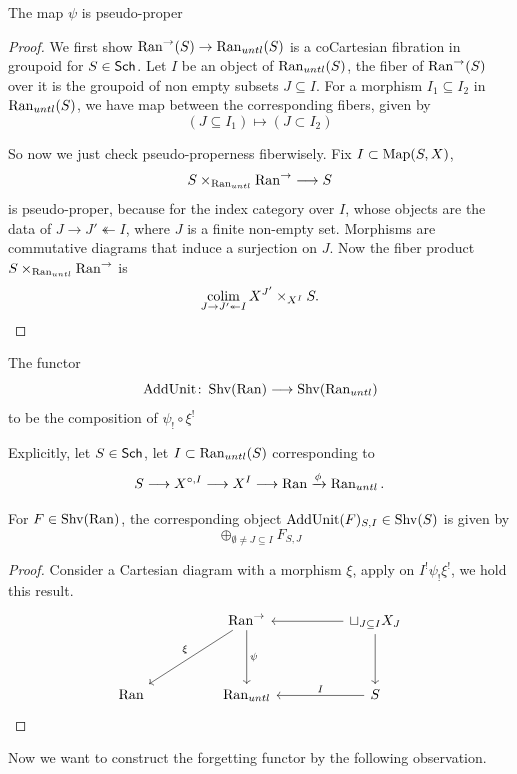 \documentclass[oneside]{amsart}
\begin{document}
\begin{proposition}\cite[Lemma~4.3.2]{abott}
     The map $\psi$ is pseudo-proper
\end{proposition}

\begin{proof}
    We first show $\Ran^{\to}(S) \to \Ran_{untl} (S)$ is a coCartesian fibration in groupoid for $S \in \mathsf{Sch}$. Let $I$ be an object of $\operatorname{Ran}_{untl}(S)$, the fiber of $\Ran^{\to}(S)$ over it is the groupoid of non empty subsets $J \subseteq I$. For a morphism $I_1 \subseteq I_2$ in $\operatorname{Ran}_{untl}(S)$, we have map between the corresponding fibers, given by 
    \[
    (J \subseteq I_1) \mapsto (J\subset I_2)
    \]

    So now we just check pseudo-properness fiberwisely. Fix $I \subset \operatorname{Map}(S,X)$, 
    \[  
    S \times_{\Ran_{untl}} \Ran^{\to} \to S
    \]
    is pseudo-proper, because for the index category over $I$, whose objects are the data of $J \to J' \twoheadleftarrow I$, where $J$ is a finite non-empty set. Morphisms are commutative diagrams that induce a surjection on $J$. Now the fiber product $  S \times_{\Ran_{untl}}\Ran^{\to} $ is
    \[  
        \colim_{J \to J' \twoheadleftarrow I} X^{J'} \times_{X^I} S.
    \]    
\end{proof}

\begin{definition}
    The functor 
    \[
    \mathrm{AddUnit} \colon \Shv(\Ran) \to \Shv(\Ran_{untl})
    \]
    to be the composition of $\psi_! \circ \xi^!$
\end{definition}

Explicitly, let $S \in \mathsf{Sch}$, let $I \subset \operatorname{Ran}_{untl}(S)$ corresponding to
\[  
    S \to X^{\circ, I} \to X^I \to \Ran \xrightarrow[]{\phi} \Ran_{untl}.
\]

\begin{proposition}
    For $F \in \operatorname{Shv}(\operatorname{Ran})$, the corresponding object $\mathrm{AddUnit}(F)_{S,I} \in \operatorname{Shv}(S)$ is given by 
    \[  
        \oplus_{\emptyset \neq J \subseteq I} F_{S,J}
    \]
\end{proposition}

\begin{proof}
Consider a Cartesian diagram with a morphism $\xi$, apply \cite[Corollary~2.3.5]{abott} on $I^! \psi_! \xi^!$, we hold this result.
\[\begin{tikzcd}
	&& {\Ran^{\to}} && {\sqcup_{J \subseteq I} X_J} \\
	\\
	\Ran && {\Ran_{untl}} && S
	\arrow["\xi"', from=1-3, to=3-1]
	\arrow["\psi", from=1-3, to=3-3]
	\arrow[from=1-5, to=1-3]
	\arrow[from=1-5, to=3-5]
	\arrow["I"', from=3-5, to=3-3]
\end{tikzcd}\]

\end{proof}
Now we want to construct the forgetting functor by the following observation.
\end{document}
